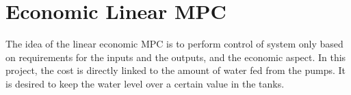 \section{Economic Linear MPC}
The idea of the linear economic MPC is to perform control of system only based on requirements for the inputs and the outputs, and the economic aspect. In this project, the cost is directly linked to the amount of water fed from the pumps. It is desired to keep the water level over a certain value in the tanks.

